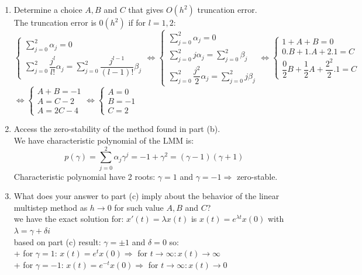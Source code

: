 \documentclass[14pt,a4paper]{article}
\begin{document}
\begin{enumerate}
	\label{2b}	
	\item Determine a choice $A,B$ and $C$ that gives $O(h^2)$ truncation error.\\
	The truncation error is $0(h^2)$ if for $ l = 1,2$:\\
	$\begin{cases} \sum_{j=0}^{2} \alpha_j = 0 \\ \sum_{j=0}^{2} \dfrac{j^l}{l!}\alpha_j = \sum_{j=0}^{2} \dfrac{j^{l-1}}{(l-1)!}\beta_j \end{cases} \Leftrightarrow \begin{cases} \sum_{j=0}^{2} \alpha_j = 0 \\ \sum_{j=0}^{2} j\alpha_j = \sum_{j=0}^{2} \beta_j \\ \sum_{j=0}^{2} \dfrac{j^2}{2}\alpha_j = \sum_{j=0}^{2} j\beta_j \end{cases} \Leftrightarrow \begin{cases} 1 + A + B = 0 \\ 0.B + 1.A + 2.1 = C \\ \dfrac{0}{2}B + \dfrac{1}{2}A + \dfrac{2^2}{2}.1 = C \end{cases}$\\
	\hspace*{2cm} $ \Leftrightarrow \begin{cases} A + B = -1 \\ A = C-2 \\ A = 2C -4 \end{cases}  \Leftrightarrow \begin{cases} A=0 \\ B = -1 \\ C =2 \end{cases} $\\
			
	\label{2c}
	\item Access the zero-stability of the method found in part (b).\\
	We have characteristic polynomial of the LMM is: 
	$$p(\gamma) = \sum_{j=0}^{2}\alpha_j\gamma^j = -1 + \gamma^2 = (\gamma - 1)(\gamma +1)$$
	Characteristic polynomial have 2 roots: $\gamma = 1$ and $\gamma = -1 \Rightarrow$ zero-stable.
		
	\label{2d}
	\item What does your answer to part (c) imply about the behavior of the linear multistep method as $h \rightarrow 0$ for such value $A,B$ and $C$?\\
	we have the exact solution for: $x'(t) = \lambda x(t)$ is $x(t) = e^{\lambda t}x(0)$ with $\lambda = \gamma + \delta i$\\
	based on part (c) result: $\gamma = \pm 1$ and $\delta = 0$ so:\\
	+ for $\gamma = 1$: $x(t) = e^tx(0) \Rightarrow$ for $t \rightarrow \infty: x(t) \rightarrow \infty$\\
	+ for $\gamma = -1$: $x(t) = e^{-t}x(0) \Rightarrow$ for $t \rightarrow \infty: x(t) \rightarrow 0$
	

\end{enumerate}
\end{document}
